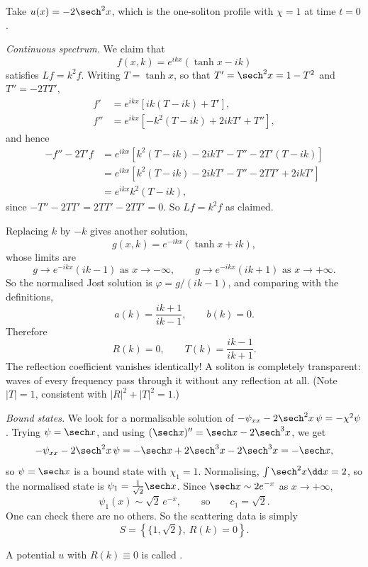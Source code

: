 \begin{example}
	Take $u(x) = -2\sech^2x$, which is the one-soliton profile with $\chi = 1$ at time $t=0$.

	\emph{Continuous spectrum.} We claim that
	$$
	f(x,k) = e^{ikx}\left(\tanh x - ik\right)
	$$
	satisfies $Lf = k^2f$. Writing $T = \tanh x$, so that $T' = \sech^2x = 1 - T^2$ and $T'' = -2TT'$,
	\begin{align*}
		f' &= e^{ikx}\left[ik(T-ik) + T'\right],\\
		f'' &= e^{ikx}\left[-k^2(T-ik) + 2ikT' + T''\right],
	\end{align*}
	and hence
	\begin{align*}
		-f'' - 2T'f &= e^{ikx}\left[k^2(T-ik) - 2ikT' - T'' - 2T'(T-ik)\right]\\
		&= e^{ikx}\left[k^2(T-ik) - 2ikT' - T'' - 2TT' + 2ikT'\right]\\
		&= e^{ikx}k^2(T-ik),
	\end{align*}
	since $-T'' - 2TT' = 2TT' - 2TT' = 0$. So $Lf = k^2f$ as claimed.

	Replacing $k$ by $-k$ gives another solution,
	$$
	g(x,k) = e^{-ikx}\left(\tanh x + ik\right),
	$$
	whose limits are
	$$
	g \to e^{-ikx}(ik - 1) \text{ as } x\to-\infty, \qquad g\to e^{-ikx}(ik+1)\text{ as }x\to+\infty.
	$$
	So the normalised Jost solution is $\varphi = g/(ik-1)$, and comparing with the definitions,
	$$
	a(k) = \frac{ik+1}{ik-1}, \qquad b(k) = 0.
	$$
	Therefore
	$$
	R(k) = 0, \qquad T(k) = \frac{ik-1}{ik+1}.
	$$
	The reflection coefficient vanishes identically! A soliton is completely transparent: waves of every frequency pass through it without any reflection at all. (Note $|T| = 1$, consistent with $|R|^2+|T|^2=1$.)

	\emph{Bound states.} We look for a normalisable solution of $-\psi_{xx} - 2\sech^2x\,\psi = -\chi^2\psi$. Trying $\psi = \sech x$, and using $(\sech x)'' = \sech x - 2\sech^3x$, we get
	$$
	-\psi_{xx} - 2\sech^2x\,\psi = -\sech x + 2\sech^3x - 2\sech^3x = -\sech x,
	$$
	so $\psi = \sech x$ is a bound state with $\chi_1 = 1$. Normalising, $\int\sech^2x\dd x = 2$, so the normalised state is $\psi_1 = \frac{1}{\sqrt2}\sech x$. Since $\sech x\sim 2e^{-x}$ as $x\to+\infty$,
	$$
	\psi_1(x)\sim\sqrt2\,e^{-x}, \qquad\text{so}\qquad c_1 = \sqrt2.
	$$
	One can check there are no others. So the scattering data is simply
	$$
	S = \left\{\{1, \sqrt2\},\ R(k) = 0\right\}.
	$$
\end{example}

\begin{definition}
	A potential $u$ with $R(k) \equiv 0$ is called .
\end{definition}

